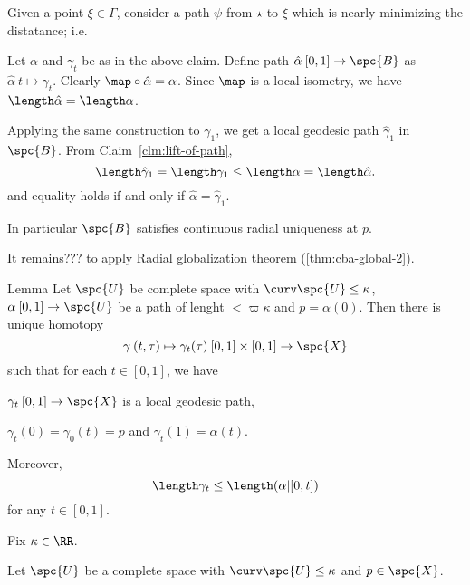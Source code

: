 Given a point $\xi\in\Gamma$,
consider a path $\psi$ from $\star$ to $\xi$ which is nearly minimizing the distatance; i.e.

Let $\alpha$ and $\gamma_t$ be as in the above claim.
Define path $\hat\alpha\:[0,1]\to \spc{B}$ as $\hat\alpha\:t\mapsto \gamma_t$.
Clearly $\map\circ\hat\alpha=\alpha$.
Since $\map$ is a local isometry, we have $\length\hat\alpha=\length\alpha$.

Applying the same construction to $\gamma_1$, we get a local geodesic path $\hat\gamma_1$ in $\spc{B}$.
From Claim~\ref{clm:lift-of-path},
$$\length\hat\gamma_1
=
\length\gamma_1
\le
\length\alpha
=
\length\hat\alpha.$$
and equality holds if and only if $\hat\alpha=\hat\gamma_1$.

In particular $\spc{B}$ satisfies continuous radial uniqueness at $p$.

It remains??? to apply Radial globalization theorem (\ref{thm:cba-global-2}).\qeds





\begin{thm}{Lemma}
Let $\spc{U}$ be complete space with $\curv\spc{U}\le\kappa$,
$\alpha\:[0,1]\to\spc{U}$ be a path of lenght $<\varpi\kappa$
and $p=\alpha(0)$.
Then there is unique homotopy 
$$\gamma\:(t,\tau)\mapsto\gamma_t(\tau)\:[0,1]\times[0,1]\to\spc{X}$$
such that for each $t\in [0,1]$, we have
\begin{subthm}{}
$\gamma_t\:[0,1]\to\spc{X}$ is a local geodesic path, 
\end{subthm}
\begin{subthm}{}
$\gamma_t(0)=\gamma_0(t)=p$ and $\gamma_t(1)=\alpha(t)$.
\end{subthm}


Moreover, 
$$\length\gamma_t\le\length(\alpha|[0,t])$$ 
for any $t\in[0,1]$.
\end{thm}

Fix $\kappa\in \RR$.

Let $\spc{U}$ be a complete space with $\curv\spc{U}\le\kappa$ and $p\in\spc{X}$.




